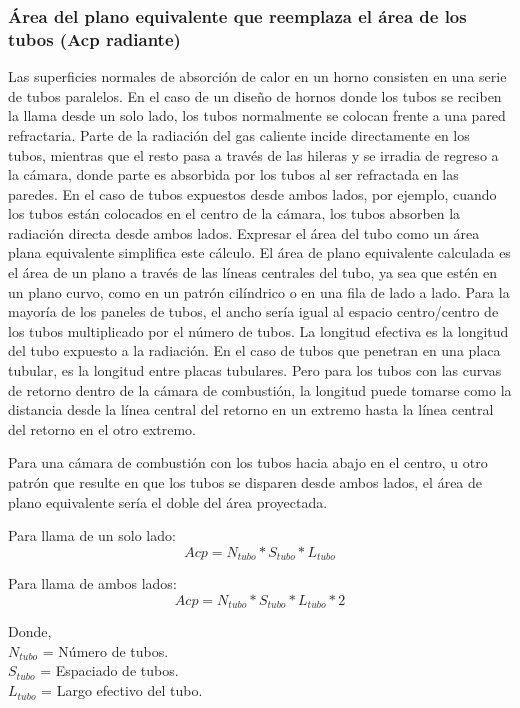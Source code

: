 \subsubsection{Área del plano equivalente que reemplaza el área de los tubos (Acp radiante)}
\par Las superficies normales de absorción de calor en un horno consisten en una serie de tubos paralelos. En el caso de un diseño de hornos donde los tubos se reciben la llama desde un solo lado, los tubos normalmente se colocan frente a una pared refractaria. Parte de la radiación del gas caliente incide directamente en los tubos, mientras que el resto pasa a través de las hileras y se irradia de regreso a la cámara, donde parte es absorbida por los tubos al ser refractada en las paredes. En el caso de tubos expuestos desde ambos lados, por ejemplo, cuando los tubos están colocados en el centro de la cámara, los tubos absorben la radiación directa desde ambos lados. Expresar el área del tubo como un área plana equivalente simplifica este cálculo. El área de plano equivalente calculada es el área de un plano a través de las líneas centrales del tubo, ya sea que estén en un plano curvo, como en un patrón cilíndrico o en una fila de lado a lado. Para la mayoría de los paneles de tubos, el ancho sería igual al espacio centro/centro de los tubos multiplicado por el número de tubos. La longitud efectiva es la longitud del tubo expuesto a la radiación. En el caso de tubos que penetran en una placa tubular, es la longitud entre placas tubulares. Pero para los tubos con las curvas de retorno dentro de la cámara de combustión, la longitud puede tomarse como la distancia desde la línea central del retorno en un extremo hasta la línea central del retorno en el otro extremo.
\par Para una cámara de combustión con los tubos hacia abajo en el centro, u otro patrón que resulte en que los tubos se disparen desde ambos lados, el área de plano equivalente sería el doble del área proyectada.
\par Para llama de un solo lado:
\begin{equation}
Acp = N_{tubo} * S_{tubo} * L_{tubo}
\end{equation}
\par Para llama de ambos lados:
\begin{equation*}
Acp = N_{tubo} * S_{tubo} * L_{tubo} * 2
\end{equation*}
\par Donde, \\
$N_{tubo}$ = Número de tubos. \\
$S_{tubo}$ = Espaciado de tubos. \\
$L_{tubo}$ = Largo efectivo del tubo.

